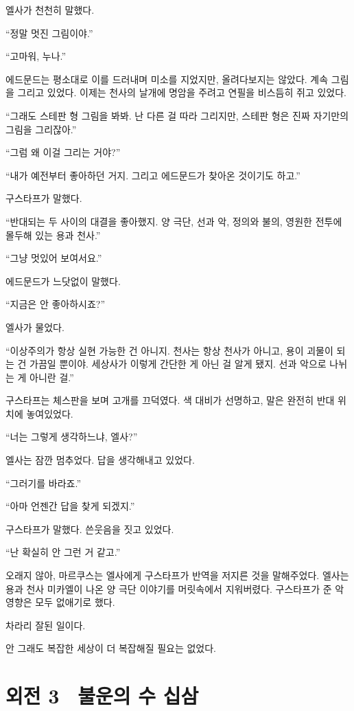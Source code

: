 엘사가 천천히 말했다.

``정말 멋진 그림이야.''

``고마워, 누나.''

에드문드는 평소대로 이를 드러내며 미소를 지었지만, 올려다보지는 않았다. 계속 그림을 그리고 있었다. 이제는 천사의 날개에 명암을 주려고 연필을 비스듬히 쥐고 있었다.

``그래도 스테판 형 그림을 봐봐. 난 다른 걸 따라 그리지만, 스테판 형은 진짜 자기만의 그림을 그리잖아.''

``그럼 왜 이걸 그리는 거야?''

``내가 예전부터 좋아하던 거지. 그리고 에드문드가 찾아온 것이기도 하고.''

구스타프가 말했다.

``반대되는 두 사이의 대결을 좋아했지. 양 극단, 선과 악, 정의와 불의, 영원한 전투에 몰두해 있는 용과 천사.''

``그냥 멋있어 보여서요.''

에드문드가 느닷없이 말했다.

``지금은 안 좋아하시죠?''

엘사가 물었다.

``이상주의가 항상 실현 가능한 건 아니지. 천사는 항상 천사가 아니고, 용이 괴물이 되는 건 가끔일 뿐이야. 세상사가 이렇게 간단한 게 아닌 걸 알게 됐지. 선과 악으로 나뉘는 게 아니란 걸.''

구스타프는 체스판을 보며 고개를 끄덕였다. 색 대비가 선명하고, 말은 완전히 반대 위치에 놓여있었다.

``너는 그렇게 생각하느냐, 엘사?''

엘사는 잠깐 멈추었다. 답을 생각해내고 있었다.

``그러기를 바라죠.''

``아마 언젠간 답을 찾게 되겠지.''

구스타프가 말했다. 쓴웃음을 짓고 있었다.

``난 확실히 안 그런 거 같고.''

\textbreak

오래지 않아, 마르쿠스는 엘사에게 구스타프가 반역을 저지른 것을 말해주었다. 엘사는 용과 천사 미카엘이 나온 양 극단 이야기를 머릿속에서 지워버렸다. 구스타프가 준 악영향은 모두 없애기로 했다.

차라리 잘된 일이다.

안 그래도 복잡한 세상이 더 복잡해질 필요는 없었다.



\chapter[외전3. 불운의 수 십삼][외전 3\hspace*{.5em}불운의 수 십삼]{외전 3 \ 불운의 수 십삼}



